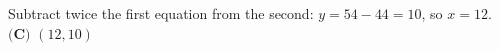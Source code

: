 Subtract twice the first equation from the second: \(y=54-44=10\), so \(x=12\). \(\boxed{\textbf{(C) } (12,10)}\)
